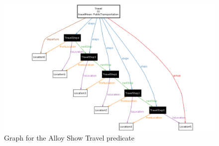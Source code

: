 \begin{figure}
	\hspace*{-2cm}
	\centering\includegraphics[scale=0.5]{Images/AlloyShowTravel2.png}
	\caption{Graph for the Alloy Show Travel predicate}
\end{figure}